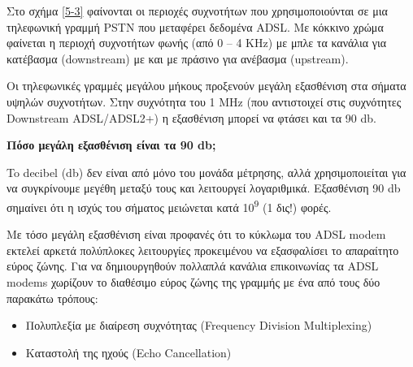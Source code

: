 Στο σχήμα \ref{5-3} φαίνονται οι περιοχές συχνοτήτων που χρησιμοποιούνται σε μια τηλεφωνική γραμμή PSTN που μεταφέρει δεδομένα ADSL. Με κόκκινο χρώμα φαίνεται η περιοχή συχνοτήτων φωνής (από 0 -- 4 KHz) με μπλε τα κανάλια για κατέβασμα (downstream) με και με πράσινο για ανέβασμα (upstream). 

Οι τηλεφωνικές γραμμές μεγάλου μήκους προξενούν μεγάλη εξασθένιση στα σήματα υψηλών συχνοτήτων. Στην συχνότητα του 1 MHz (που αντιστοιχεί στις συχνότητες Downstream ADSL/ADSL2+) η εξασθένιση μπορεί να φτάσει και τα 90 db.

\begin{inthebox}
\textbf{Πόσο μεγάλη εξασθένιση είναι τα 90 db;}

To decibel (db) δεν είναι από μόνο του μονάδα μέτρησης, αλλά χρησιμοποιείται για να συγκρίνουμε μεγέθη μεταξύ τους και λειτουργεί λογαριθμικά. Εξασθένιση 90 db σημαίνει ότι η ισχύς του σήματος μειώνεται κατά 10\textsuperscript{9} (1 δις!) φορές.\\
\end{inthebox}

Με τόσο μεγάλη εξασθένιση είναι προφανές ότι το κύκλωμα του ADSL modem εκτελεί αρκετά πολύπλοκες λειτουργίες προκειμένου να εξασφαλίσει το απαραίτητο εύρος ζώνης. Για να δημιουργηθούν πολλαπλά κανάλια επικοινωνίας τα ADSL modems χωρίζουν το διαθέσιμο εύρος ζώνης της γραμμής με ένα από τους δύο παρακάτω τρόπους:

\begin{itemize}
\item Πολυπλεξία με διαίρεση συχνότητας (Frequency Division Multiplexing)
\item Καταστολή της ηχούς (Echo Cancellation)
\end{itemize}

